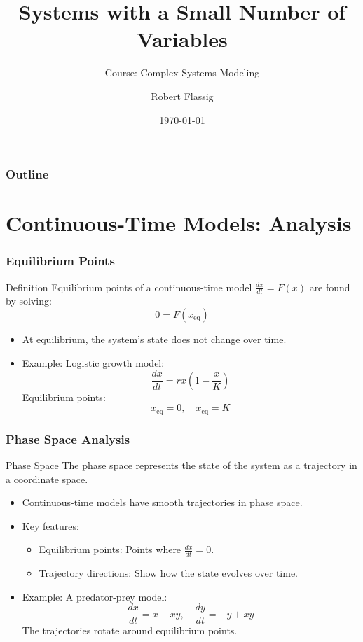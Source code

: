 \documentclass{beamer}
\title{Systems with a Small Number of
Variables}
\subtitle{Course: Complex Systems Modeling}
\author{Robert Flassig}
\institute{Brandenburg University of Applied Sciences}
\date{\today}
\begin{document}
\begin{frame}
\titlepage
\end{frame}

\begin{frame}
\frametitle{Outline}
\tableofcontents
\end{frame}

\section{Continuous-Time Models: Analysis}
\begin{frame}
\frametitle{Equilibrium Points}

\begin{block}{Definition}
Equilibrium points of a continuous-time model \(\frac{dx}{dt} = F(x)\) are found by solving:
\[
0 = F(x_{\text{eq}})
\]
\end{block}

\begin{itemize}
    \item At equilibrium, the system's state does not change over time.
    \item Example: Logistic growth model:
    \[
    \frac{dx}{dt} = r x \left(1 - \frac{x}{K}\right)
    \]
    Equilibrium points:
    \[
    x_{\text{eq}} = 0, \quad x_{\text{eq}} = K
    \]
\end{itemize}

\end{frame}

\begin{frame}
\frametitle{Phase Space Analysis}

\begin{block}{Phase Space}
The phase space represents the state of the system as a trajectory in a coordinate space.
\end{block}

\begin{itemize}
    \item Continuous-time models have smooth trajectories in phase space.
    \item Key features:
    \begin{itemize}
        \item Equilibrium points: Points where \(\frac{dx}{dt} = 0\).
        \item Trajectory directions: Show how the state evolves over time.
    \end{itemize}
    \item Example: A predator-prey model:
    \[
    \frac{dx}{dt} = x - xy, \quad \frac{dy}{dt} = -y + xy
    \]
    The trajectories rotate around equilibrium points.
\end{itemize}

\end{frame}
\end{document}
